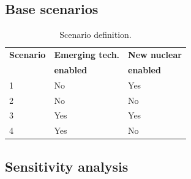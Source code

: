 \subsection{Base scenarios}
\begin{table}[!ht]
	\caption{Scenario definition.}
	\vspace{0.1in}
	\begin{tabularx}{\textwidth}{p{} p{} p{}}
\hline 
\textbf{Scenario}& \textbf{Emerging tech.} & \textbf{New nuclear} \\
                 & \textbf{enabled} & \textbf{enabled} \\
                  \hline
1               &   No       &      Yes     \\ 
2               &  No       &         No       \\ 
3               &   Yes     &      Yes     \\ 
4               &   Yes     &         No       \\

\hline
	\end{tabularx}
\label{scen-table}
\end{table}
\subsection{Sensitivity analysis}

